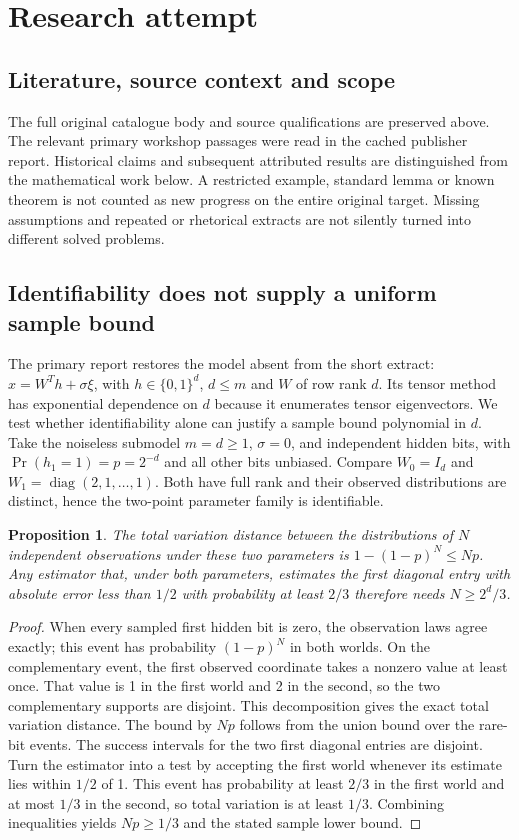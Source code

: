 \documentclass[11pt]{article}
\newtheorem{proposition}{Proposition}
\begin{document}
\section{Research attempt}
\subsection{Literature, source context and scope}
The full original catalogue body and source qualifications are preserved above. The relevant primary workshop passages were read in the cached publisher report. Historical claims and subsequent attributed results are distinguished from the mathematical work below. A restricted example, standard lemma or known theorem is not counted as new progress on the entire original target. Missing assumptions and repeated or rhetorical extracts are not silently turned into different solved problems.

\subsection{Identifiability does not supply a uniform sample bound}
The primary report restores the model absent from the short extract: $x=W^Th+\sigma\xi$, with $h\in\{0,1\}^d$, $d\le m$ and $W$ of row rank $d$. Its tensor method has exponential dependence on $d$ because it enumerates tensor eigenvectors. We test whether identifiability alone can justify a sample bound polynomial in $d$.
Take the noiseless submodel $m=d\ge1$, $\sigma=0$, and independent hidden bits, with $\Pr(h_1=1)=p=2^{-d}$ and all other bits unbiased. Compare $W_0=I_d$ and $W_1=\operatorname{diag}(2,1,\ldots,1)$. Both have full rank and their observed distributions are distinct, hence the two-point parameter family is identifiable.
\begin{proposition}
The total variation distance between the distributions of $N$ independent observations under these two parameters is $1-(1-p)^N\le Np$. Any estimator that, under both parameters, estimates the first diagonal entry with absolute error less than $1/2$ with probability at least $2/3$ therefore needs $N\ge2^d/3$.
\end{proposition}
\begin{proof}
When every sampled first hidden bit is zero, the observation laws agree exactly; this event has probability $(1-p)^N$ in both worlds. On the complementary event, the first observed coordinate takes a nonzero value at least once. That value is 1 in the first world and 2 in the second, so the two complementary supports are disjoint. This decomposition gives the exact total variation distance. The bound by $Np$ follows from the union bound over the rare-bit events.
The success intervals for the two first diagonal entries are disjoint. Turn the estimator into a test by accepting the first world whenever its estimate lies within $1/2$ of 1. This event has probability at least $2/3$ in the first world and at most $1/3$ in the second, so total variation is at least $1/3$. Combining inequalities yields $Np\ge1/3$ and the stated sample lower bound.
\end{proof}
\end{document}
